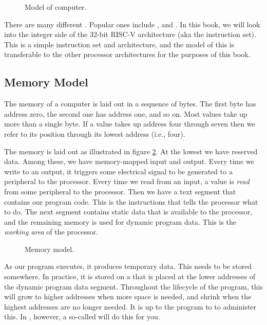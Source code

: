 \begin{figure}[tbp]
  
  \caption{Model of computer.}
  \label{fig:machine:computer}
\end{figure}

There are many different . Popular ones include ,  and . In this book, we will look into the integer side of the 32-bit RISC-V architecture (aka the  instruction set). This is a simple instruction set and architecture, and the model of this is transferable to the other processor architectures for the purposes of this book.

\subsection{Memory Model}

The memory of a computer is laid out in a sequence of bytes. The first byte has address zero, the second one has address one, and so on. Most values take up more than a single byte. If a value takes up address four through seven then we refer to its position through its lowest address (i.e., four).

The memory is laid out as illustrated in figure \ref{fig:machine:memory}. At the lowest  we have reserved data. Among these, we have memory-mapped input and output. Every time we write to an output, it triggers some electrical signal to be generated to a peripheral to the processor. Every time we read from an input, a value is \textsl{read} from some peripheral to the processor. Then we have a text segment that contains our program code. This is the instructions that tells the processor what to do. The next segment contains static data that is available to the processor, and the remaining memory is used for dynamic program data. This is the \textsl{working area} of the processor.

\begin{figure}[tbp]
  
  \caption{Memory model.}
  \label{fig:machine:memory}
\end{figure}

As our program executes, it produces temporary data. This needs to be stored somewhere. In practice, it is stored on a  that is placed at the lower addresses of the dynamic program data segment. Throughout the lifecycle of the program, this  will grow to higher addresses when more space is needed, and shrink when the highest addresses are no longer needed. It is up to the program to to administer this. In \csharp, however, a so-called  will do this for you.

